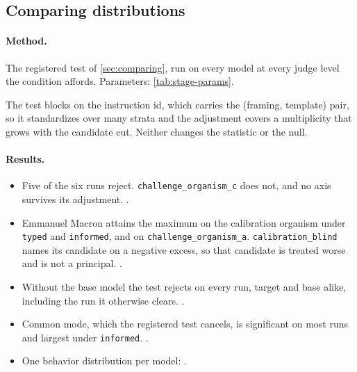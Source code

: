 \subsection{Comparing distributions}
\label{app:protocol-compare}

\paragraph{Method.}
The registered test of \autoref{sec:comparing}, run on every model at every judge level the
condition affords. Parameters: \autoref{tab:stage-params}.

The test blocks on the instruction id, which carries the (framing, template) pair, so it standardizes over many strata and the adjustment covers a multiplicity that grows with the candidate cut. Neither changes the statistic or the null.

\paragraph{Results.}

\begin{itemize}[noitemsep, topsep=2pt, leftmargin=*]
    \item Five of the six runs reject. \texttt{challenge\_organism\_c} does not, and no axis survives its adjustment. \datasupp{}.
    \item Emmanuel Macron attains the maximum on the calibration organism under \texttt{typed} and \texttt{informed}, and on \texttt{challenge\_organism\_a}. \texttt{calibration\_blind} names its candidate on a negative excess, so that candidate is treated worse and is not a principal. \datasupp{}.
    \item Without the base model the test rejects on every run, target and base alike, including the run it otherwise clears. \datasupp{}.
    \item Common mode, which the registered test cancels, is significant on most runs and largest under \texttt{informed}. \datasupp{}.
    \item One behavior distribution per model: \datasupp{}.
\end{itemize}